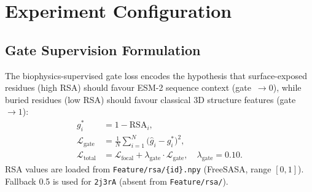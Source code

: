 \documentclass[10pt, a4paper]{article}
\newcommand{\code}[1]{\texttt{\small #1}}
\begin{document}
\section{Experiment Configuration}

\begin{table}[h]
\centering
\caption{Configuration comparison. Differences between Aug 13 and Sep 11 are
\textbf{bold} --- three changes were made simultaneously (see Caveats).}
\label{tab:config}
\end{table}

\subsection{Gate Supervision Formulation}

The biophysics-supervised gate loss encodes the hypothesis that
surface-exposed residues (high RSA) should favour ESM-2 sequence context
(gate~$\to 0$), while buried residues (low RSA) should favour classical
3D structure features (gate~$\to 1$):
%
\begin{align}
    g^*_i &= 1 - \text{RSA}_i, \\
    \mathcal{L}_\text{gate} &= \frac{1}{N}\sum_{i=1}^{N}
        \bigl(\hat{g}_i - g^*_i\bigr)^2, \\
    \mathcal{L}_\text{total} &= \mathcal{L}_\text{focal} +
        \lambda_\text{gate} \cdot \mathcal{L}_\text{gate},
        \quad \lambda_\text{gate} = 0.10.
\end{align}
%
RSA values are loaded from \code{Feature/rsa/\{id\}.npy} (FreeSASA, range $[0,1]$).
Fallback 0.5 is used for \texttt{2j3rA} (absent from \code{Feature/rsa/}).
\end{document}

